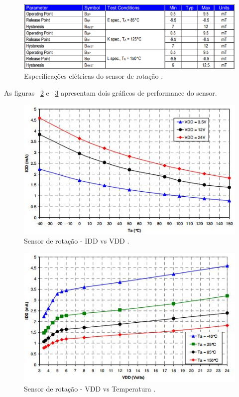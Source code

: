 	\begin{figure}[!htbp]
	  \centering
	  \includegraphics[scale=0.5]{editaveis/figuras/sensor_rotacao_spec_mag}
	  \caption[Especificações elétricas do sensor de rotação]
	  {Especificações elétricas do sensor de rotação \cite{melexis}.}
	  \label{sensor_rotacao_spec_mag}
	\end{figure}
	
	As figuras ~\ref{sensor_rotacao_idd_vs_vdd} e ~\ref{sensor_rotacao_vdd_vs_temperatura} apresentam dois gráficos
	de performance do sensor.
	
	\begin{figure}[!htbp]
	  \centering
	  \includegraphics[scale=0.5]{editaveis/figuras/sensor_rotacao_idd_vs_vdd}
	  \caption[Sensor de rotação -  IDD vs VDD]
	  {Sensor de rotação -  IDD vs VDD \cite{melexis}.}
	  \label{sensor_rotacao_idd_vs_vdd}
	\end{figure}
	
	\begin{figure}[!htbp]
	  \centering
	  \includegraphics[scale=0.5]{editaveis/figuras/sensor_rotacao_vdd_vs_temperatura}
	  \caption[Sensor de rotação -  VDD vs Temperatura]
	  {Sensor de rotação -  VDD vs Temperatura \cite{melexis}.}
	  \label{sensor_rotacao_vdd_vs_temperatura}
	\end{figure}
	
